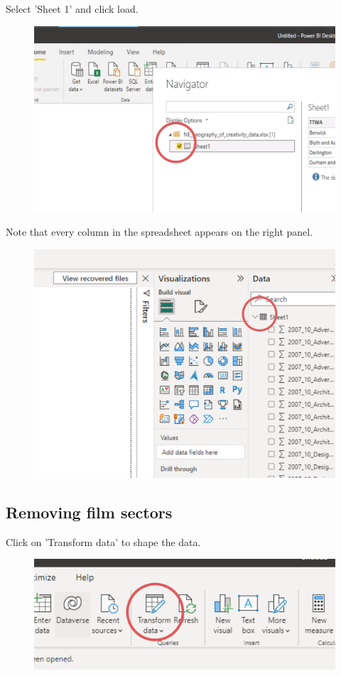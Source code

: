 \documentclass[11pt]{article}
\begin{document}
Select 'Sheet 1' and click load.

\begin{figure}[h!]
    \centering
    \includegraphics[width=.6\linewidth]{img/selectSheet.png}
\end{figure}

Note that every column in the spreadsheet appears on the right panel.

\begin{figure}[h!]
    \centering
    \includegraphics[width=.5\linewidth]{img/loadedData.png}
\end{figure}

\clearpage

\subsection{Removing film sectors}

Click on 'Transform data' to shape the data.

\begin{figure}[h!]
    \centering
    \includegraphics[width=.4\linewidth]{img/transformData.png}
\end{figure}
\end{document}

